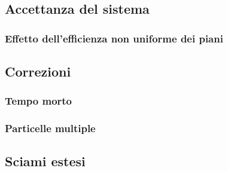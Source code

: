 \documentclass[11pt]{article}
\begin{document}
\subsection{Accettanza del sistema}
\subsubsection{Effetto dell'efficienza non uniforme dei piani}
\subsection{Correzioni}
\subsubsection{Tempo morto}
\subsubsection{Particelle multiple}
\subsection{Sciami estesi}


\end{document}

